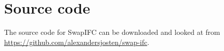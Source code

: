\chapter{Source code}
The source code for SwapIFC can be downloaded and looked at from \url{https://github.com/alexandersjosten/swap-ifc}.
